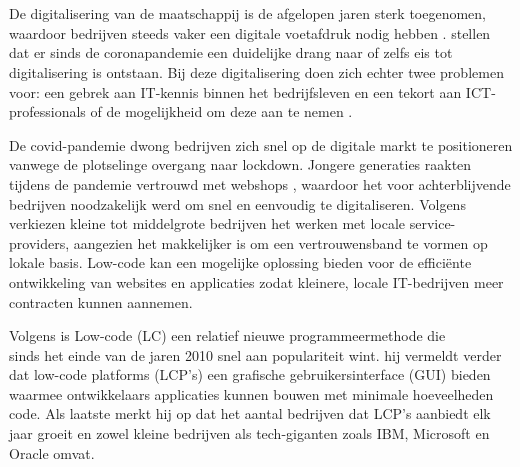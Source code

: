 
\chapter{}%
\label{ch:inleiding}

De digitalisering van de maatschappij is de afgelopen jaren sterk toegenomen, waardoor bedrijven steeds vaker een digitale voetafdruk nodig hebben \autocite{schwab2016fourth}. \textcite{almeida2020challenges} stellen dat er sinds de coronapandemie een duidelijke drang naar of zelfs eis tot digitalisering is ontstaan. Bij deze digitalisering doen zich echter twee problemen voor: een gebrek aan IT-kennis binnen het bedrijfsleven \autocite{kutnjak2021covid} en een tekort aan ICT-professionals of de mogelijkheid om deze aan te nemen \autocite{VDAB2024}. 

\vspace{\baselineskip}

De covid-pandemie dwong bedrijven zich snel op de digitale markt te positioneren vanwege de plotselinge overgang naar lockdown. Jongere generaties raakten tijdens de pandemie vertrouwd met webshops \autocite{almeida2020challenges}, waardoor het voor achterblijvende bedrijven noodzakelijk werd om snel en eenvoudig te digitaliseren. Volgens \textcite{findikoglu2011small} verkiezen kleine tot middelgrote bedrijven het werken met locale service-providers, aangezien het makkelijker is om een vertrouwensband te vormen op lokale basis. Low-code kan een mogelijke oplossing bieden voor de efficiënte ontwikkeling van websites en applicaties zodat kleinere, locale IT-bedrijven meer contracten kunnen aannemen. 

\vspace{\baselineskip}

Volgens \textcite{bock2021low} is Low-code (LC) een relatief nieuwe programmeermethode die \\sinds het einde van de jaren 2010 snel aan populariteit wint. hij vermeldt verder dat low-code platforms (LCP’s) een grafische gebruikersinterface (GUI) bieden waarmee ontwikkelaars applicaties kunnen bouwen met minimale hoeveelheden code. Als laatste merkt hij op dat het aantal bedrijven dat LCP's aanbiedt elk jaar groeit en zowel kleine bedrijven als tech-giganten zoals IBM, Microsoft en Oracle omvat.

